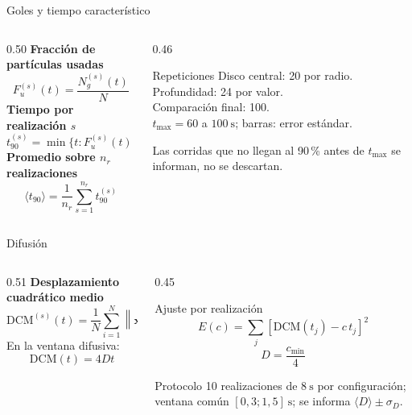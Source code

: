 \documentclass[aspectratio=169,11pt]{beamer}
\begin{document}
\begin{frame}{Goles y tiempo característico}
  \begin{columns}[T,onlytextwidth]
    \begin{column}{0.50\textwidth}
      \textbf{Fracción de partículas usadas}
      \[
        F_u^{(s)}(t)=\frac{N_g^{(s)}(t)}{N}
      \]
      \textbf{Tiempo por realización $s$}
      \[
        t_{90}^{(s)}=\min\{t:F_u^{(s)}(t)\geq0{,}9\}
      \]
      \textbf{Promedio sobre $n_r$ realizaciones}
      \[
        \langle t_{90}\rangle=\frac{1}{n_r}\sum_{s=1}^{n_r}t_{90}^{(s)}
      \]
    \end{column}
    \begin{column}{0.46\textwidth}
      \begin{block}{Repeticiones}
        {\small
        Disco central: 20 por radio.\\
        Profundidad: 24 por valor.\\
        Comparación final: 100.\\
        $t_{\max}=60$ a $100\ \mathrm{s}$; barras: error estándar.}
      \end{block}
      \small Las corridas que no llegan al 90\,\% antes de $t_{\max}$ se informan, no se descartan.
    \end{column}
  \end{columns}
\end{frame}

\begin{frame}{Difusión}
  \begin{columns}[T,onlytextwidth]
    \begin{column}{0.51\textwidth}
      \textbf{Desplazamiento cuadrático medio}
      \[
        \mathrm{DCM}^{(s)}(t)=\frac{1}{N}\sum_{i=1}^{N}
        \left\lVert\bm{x}_i^{(s)}(t)-\bm{x}_i^{(s)}(0)\right\rVert^2
      \]
      En la ventana difusiva:
      \[
        \mathrm{DCM}(t)=4Dt
      \]
    \end{column}
    \begin{column}{0.45\textwidth}
      \begin{block}{Ajuste por realización}
        \[
          E(c)=\sum_j\left[\mathrm{DCM}(t_j)-c\,t_j\right]^2
        \]
        \[
          D=\frac{c_{\min}}{4}
        \]
      \end{block}
      \begin{block}{Protocolo}
        10 realizaciones de $8\ \mathrm{s}$ por configuración; ventana común $[0{,}3;1{,}5]\ \mathrm{s}$; se informa $\langle D\rangle\pm\sigma_D$.
      \end{block}
    \end{column}
  \end{columns}
\end{frame}
\end{document}
